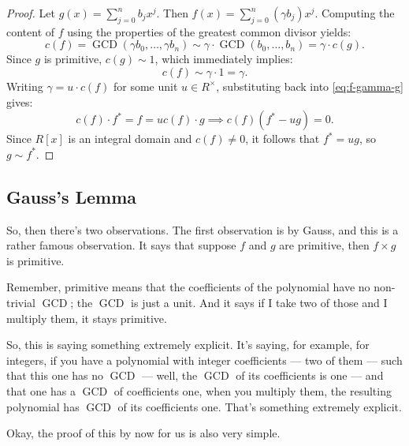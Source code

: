 \begin{content}

\begin{proof}
Let $g(x) = \sum_{j=0}^n b_j x^j$. Then $f(x) = \sum_{j=0}^n (\gamma b_j) x^j$. Computing the content of $f$ using the properties of the greatest common divisor yields:
\[
c(f) = \operatorname{GCD}(\gamma b_0, \dots, \gamma b_n) \sim \gamma \cdot \operatorname{GCD}(b_0, \dots, b_n) = \gamma \cdot c(g).
\]
Since $g$ is primitive, $c(g) \sim 1$, which immediately implies:
\[
c(f) \sim \gamma \cdot 1 = \gamma.
\]
Writing $\gamma = u \cdot c(f)$ for some unit $u \in R^\times$, substituting back into \eqref{eq:f-gamma-g} gives:
\[
c(f) \cdot f^* = f = u c(f) \cdot g \implies c(f)(f^* - u g) = 0.
\]
Since $R[x]$ is an integral domain and $c(f) \neq 0$, it follows that $f^* = u g$, so $g \sim f^*$.
\end{proof}
\end{content}

\subsection{Gauss's Lemma}

\begin{speech}[00:10:10 - 00:11:20]
So, then there's two observations. The first observation is by Gauss, and this is a rather famous observation. It says that suppose $f$ and $g$ are primitive, then $f \times g$ is primitive. 

Remember, primitive means that the coefficients of the polynomial have no non-trivial $\operatorname{GCD}$; the $\operatorname{GCD}$ is just a unit. And it says if I take two of those and I multiply them, it stays primitive.

So, this is saying something extremely explicit. It's saying, for example, for integers, if you have a polynomial with integer coefficients --- two of them --- such that this one has no $\operatorname{GCD}$ --- well, the $\operatorname{GCD}$ of its coefficients is one --- and that one has a $\operatorname{GCD}$ of coefficients one, when you multiply them, the resulting polynomial has $\operatorname{GCD}$ of its coefficients one. That's something extremely explicit.

Okay, the proof of this by now for us is also very simple.
\end{speech}

